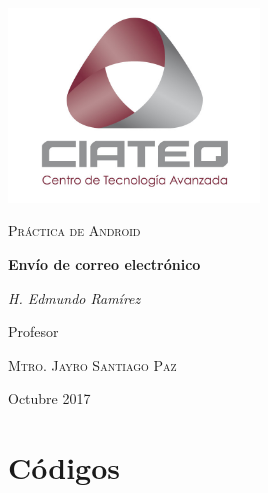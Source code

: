\documentclass{report}
\begin{document}
\begin{titlepage}

	\centering
	\includegraphics[width=0.5\textwidth]{../images/ciateq.jpg}\par\vspace{1cm}
	\vspace{1cm}
	{\scshape\Large Pr\'{a}ctica de Android\par}
	\vspace{1.5cm}
	{\huge\bfseries Env\'{i}o de correo electr\'{o}nico}\\
	\vspace{2cm}
	{\Large\itshape H. Edmundo Ram\'{i}rez\par}
	\vfill
	Profesor\par
	\textsc{Mtro. Jayro Santiago Paz}
	\vfill

	{\large \date sOctubre 2017\par}
\end{titlepage}

\chapter{C\'{o}digos}
\end{document}
